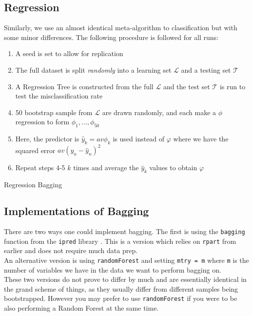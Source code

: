 \documentclass[11pt,a4paper]{report}
\begin{document}
\subsection{Regression}
Similarly, we use an almost identical meta-algorithm to classification but with some minor differences.
The following procedure is followed for all runs:
\begin{algorithm}
\begin{enumerate}
    \item A seed is set to allow for replication
    
    \item The full dataset is split \textit{randomly} into a learning set $\mathcal{L}$ and a testing set $\mathcal{T}$
    
    \item A Regression Tree is constructed from the full $\mathcal{L}$ and the test set $\mathcal{T}$ is run to test the misclassification rate
    
    \item 50 bootstrap sample from $\mathcal{L}$ are drawn randomly, and each make a $\phi$ regression to form $\phi_1, \dots, \phi_{50}$
    
    \item Here, the predictor is $\hat{y}_k = av\phi_k$ is used instead of $\varphi$ where we have the squared error $av(y_n - \hat{y}_n)^2$
    
    \item Repeat steps 4-5 $k$ times and average the $\hat{y}_k$ values to obtain $\varphi$
\end{enumerate}
\caption{Regression Bagging}
\end{algorithm}


\subsection{Implementations of Bagging}
There are two ways one could implement bagging. The first is using the \texttt{bagging} function from the \texttt{ipred} library \cite{ipred}. 
This is a version which relies on \texttt{rpart} from earlier and does not require much data prep. 
\bigskip\\
An alternative version is using \texttt{randomForest} \cite{Rforest} and setting \texttt{mtry = m} where \texttt{m} is the number of variables we have in the data we want to perform bagging on.
\bigskip\\
These two versions do not prove to differ by much and are essentially identical in the grand scheme of things, as they usually differ from different samples being bootstrapped.
However you may prefer to use \texttt{randomForest} if you were to be also performing a Random Forest at the same time. 
\end{document}
